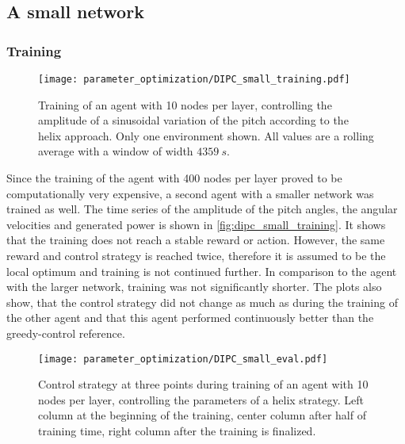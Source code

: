 \subsection{A small network}
\subsubsection{Training}
\begin{figure}[h]
	\centering
	\texttt{[image: parameter\_optimization/DIPC\_small\_training.pdf]}
	\caption{Training of an agent with 10 nodes per layer, controlling the amplitude of a sinusoidal variation of the pitch according to the helix approach. Only one environment shown. All values are a rolling average with a window of width $\SI{4359}{s}$.}
	\label{fig:dipc_small_training}
\end{figure}
Since the training of the agent with 400 nodes per layer proved to be computationally very expensive, a second agent with a smaller network was trained as well. The time series of the amplitude of the pitch angles, the angular velocities and generated power is shown in \autoref{fig:dipc_small_training}. It shows that the training does not reach a stable reward or action. However, the same reward and control strategy is reached twice, therefore it is assumed to be the local optimum and training is not continued further. In comparison to the agent with the larger network, training was not significantly shorter. The plots also show, that the control strategy did not change as much as during the training of the other agent and that this agent performed continuously better than the greedy-control reference.
\begin{figure}[h]
\centering
\texttt{[image: parameter\_optimization/DIPC\_small\_eval.pdf]}
\caption{Control strategy at three points during training of an agent with 10 nodes per layer, controlling the parameters of a helix strategy. Left column at the beginning of the training, center column after half of training time, right column after the training is finalized.}
\label{fig:dipc_small_strategies}
\end{figure} \\

